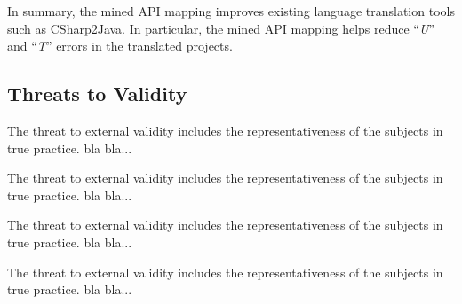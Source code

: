 In summary, the mined API mapping improves existing language
translation tools such as CSharp2Java. In particular, the mined API
mapping helps reduce ``\emph{U}'' and ``\emph{T}'' errors in the
translated projects.


\subsection{Threats to Validity}
\label{sec:experiment:threats} The threat to external validity
includes the representativeness of the subjects in true practice.
bla bla...

The threat to external validity includes the representativeness of
the subjects in true practice. bla bla...

The threat to external validity includes the representativeness of
the subjects in true practice. bla bla...

The threat to external validity includes the representativeness of
the subjects in true practice. bla bla...
